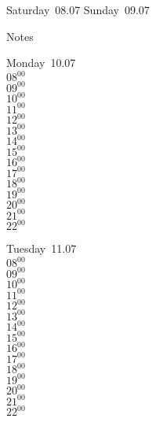 \documentclass[11pt,a4paper]{book}\usepackage[]{graphicx}\usepackage[]{color}
\begin{document}
\begin{weekendbox}
  Saturday~08.07
  \tcblower
  Sunday~09.07
\end{weekendbox} %
\begin{notebox}
  Notes
\end{notebox}
\clearpage
\begin{headerbox}
\end{headerbox}
\begin{weekdaybox}
  Monday~10.07\\
  { 
  \vfill
  $08^{00}$\\
$09^{00}$\\
$10^{00}$\\
$11^{00}$\\
$12^{00}$\\
$13^{00}$\\
$14^{00}$\\
$15^{00}$\\
$16^{00}$\\
$17^{00}$\\
$18^{00}$\\
$19^{00}$\\
$20^{00}$\\
$21^{00}$\\
$22^{00}$\\
  }
\end{weekdaybox}
\begin{weekdaybox}
  Tuesday~11.07\\
  { 
  \vfill
  $08^{00}$\\
$09^{00}$\\
$10^{00}$\\
$11^{00}$\\
$12^{00}$\\
$13^{00}$\\
$14^{00}$\\
$15^{00}$\\
$16^{00}$\\
$17^{00}$\\
$18^{00}$\\
$19^{00}$\\
$20^{00}$\\
$21^{00}$\\
$22^{00}$\\
  }
\end{weekdaybox}
\end{document}
